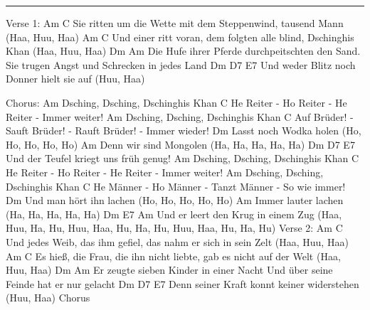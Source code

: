 \noindent\rule{\columnwidth}{1pt}

\begin{lstsong}
Verse 1:
      Am                                             C
Sie ritten um die Wette mit dem Steppenwind, tausend Mann (Haa, Huu, Haa) 
Am                                                      C
Und einer ritt voran, dem folgten alle blind, Dschinghis Khan (Haa, Huu, Haa) 
    Dm                                          Am
Die Hufe ihrer Pferde durchpeitschten den Sand. Sie trugen Angst und Schrecken in jedes Land
    Dm               D7               E7
Und weder Blitz noch Donner hielt sie auf (Huu, Haa)

Chorus:
Am
Dsching, Dsching, Dschinghis Khan 
C
He Reiter - Ho Reiter - He Reiter - Immer weiter! 
Am
Dsching, Dsching, Dschinghis Khan 
C
Auf Brüder! - Sauft Brüder! - Rauft Brüder! - Immer wieder!
Dm
Lasst noch Wodka holen (Ho, Ho, Ho, Ho, Ho) 
Am
Denn wir sind Mongolen (Ha, Ha, Ha, Ha, Ha) 
Dm                 D7                  E7
Und der Teufel kriegt uns früh genug!
Am
Dsching, Dsching, Dschinghis Khan 
C
He Reiter - Ho Reiter - He Reiter - Immer weiter!
Am
Dsching, Dsching, Dschinghis Khan 
C
He Männer - Ho Männer - Tanzt Männer - So wie immer!
Dm
Und man hört ihn lachen (Ho, Ho, Ho, Ho, Ho) 
Am
Immer lauter lachen (Ha, Ha, Ha, Ha, Ha) 
       Dm        E7            Am
Und er leert den Krug in einem Zug (Haa, Huu, Ha, Hu, Huu, Haa, Hu, Ha, Hu, Huu, Haa, Hu, Ha, Hu)
Verse 2:
    Am                                                   C
Und jedes Weib, das ihm gefiel, das nahm er sich in sein Zelt (Haa, Huu, Haa) 
Am                                                            C
Es hieß, die Frau, die ihn nicht liebte, gab es nicht auf der Welt (Haa, Huu, Haa) 
   Dm                                   Am
Er zeugte sieben Kinder in einer Nacht Und über seine Feinde hat er nur gelacht 
     Dm           D7                 E7
Denn seiner Kraft konnt keiner widerstehen (Huu, Haa)
Chorus
\end{lstsong}
\newpage

\begin{comment}
Am
Dsching, Dsching, Dschinghis Khan 
C
He Reiter - Ho Reiter - He Reiter - Immer weiter! 
Am
Dsching, Dsching, Dschinghis Khan 
C
He Männer - Ho Männer - Tanzt Männer - So wie immer!
Dm
Und man hört ihn lachen (Ho, Ho, Ho, Ho, Ho) 
Am
Immer lauter lachen (Ha, Ha, Ha, Ha, Ha) 
       Dm        E7            Am
Und er leert den Krug in einem Zug (Haa, Huu, Ha, Hu, Huu, Haa, Hu, Ha, Hu, Huu, Haa, Hu, Ha, Hu)
\end{comment}